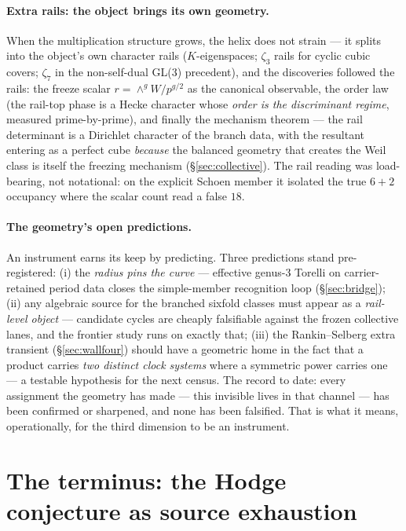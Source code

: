 \documentclass[11pt]{article}
\theoremstyle{definition}
\theoremstyle{remark}
\begin{document}
\paragraph{Extra rails: the object brings its own geometry.} When the
multiplication structure grows, the helix does not strain --- it splits
into the object's own character rails ($K$-eigenspaces; $\zeta_3$ rails for
cyclic cubic covers; $\zeta_7$ in the non-self-dual GL(3) precedent), and
the discoveries followed the rails: the freeze scalar
$r=\wedge^gW/p^{g/2}$ as the canonical observable, the order law (the
rail-top phase is a Hecke character whose \emph{order is the discriminant
regime}, measured prime-by-prime), and finally the mechanism theorem ---
the rail determinant is a Dirichlet character of the branch data, with the
resultant entering as a perfect cube \emph{because} the balanced geometry
that creates the Weil class is itself the freezing mechanism
(\S\ref{sec:collective}). The rail reading was load-bearing, not
notational: on the explicit Schoen member it isolated the true $6+2$
occupancy where the scalar count read a false $18$.

\paragraph{The geometry's open predictions.} An instrument earns its
keep by predicting. Three predictions stand pre-registered: (i) the
\emph{radius pins the curve} --- effective genus-3 Torelli on
carrier-retained period data closes the simple-member recognition loop
(\S\ref{sec:bridge}); (ii) any algebraic source for the branched sixfold
classes must appear as a \emph{rail-level object} --- candidate cycles are
cheaply falsifiable against the frozen collective lanes, and the frontier
study runs on exactly that; (iii) the Rankin--Selberg extra transient
(\S\ref{sec:wallfour}) should have a geometric home in the fact that a
product carries \emph{two distinct clock systems} where a symmetric power
carries one --- a testable hypothesis for the next census. The record to
date: every assignment the geometry has made --- this invisible lives in
that channel --- has been confirmed or sharpened, and none has been
falsified. That is what it means, operationally, for the third dimension
to be an instrument.

\section{The terminus: the Hodge conjecture as source exhaustion}\label{sec:terminus}
\end{document}
